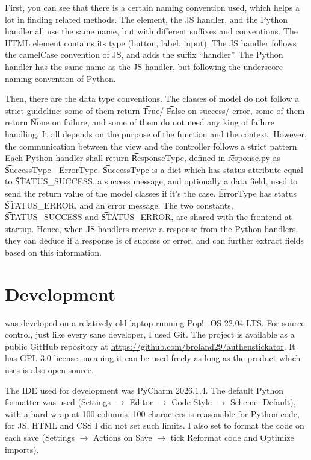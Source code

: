 First, you can see that there is a certain naming convention used, which helps a lot in finding related methods.
The element, the JS handler, and the Python handler all use the same name, but with different suffixes and conventions.
The HTML element contains its type (button, label, input).
The JS handler follows the camelCase convention of JS, and adds the suffix ``handler''.
The Python handler has the same name as the JS handler, but following the underscore naming convention of Python.

Then, there are the data type conventions.
The classes of model do not follow a strict guideline: some of them return \t{True}/ \t{False} on success/ error, some of them return \t{None} on failure, and some of them do not need any king of failure handling.
It all depends on the purpose of the function and the context.
However, the communication between the view and the controller follows a strict pattern.
Each Python handler shall return \t{ResponseType}, defined in \t{response.py} as \t {SuccessType | ErrorType}.
\t{SuccessType} is a dict which has status attribute equal to \t{STATUS\_SUCCESS}, a success message, and optionally a data field, used to send the return value of the model classes if it's the case.
\t{ErrorType} has status \t{STATUS\_ERROR}, and an error message.
The two constants, \t{STATUS\_SUCCESS} and \t{STATUS\_ERROR}, are shared with the frontend at startup.
Hence, when JS handlers receive a response from the Python handlers, they can deduce if a response is of success or error, and can further extract fields based on this information.


\section{Development} \label{lab:ch4-development}

\app{} was developed on a relatively old laptop running Pop!\_OS 22.04 LTS.
For source control, just like every sane developer, I used Git.
The project is available as a public GitHub repository at \url{https://github.com/broland29/authenstickator}.
It has GPL-3.0 license, meaning it can be used freely as long as the product which uses is also open source.

The IDE used for development was PyCharm 2026.1.4.
The default Python formatter was used (Settings $\rightarrow$ Editor $\rightarrow$ Code Style $\rightarrow$ Scheme: Default), with a hard wrap at 100 columns.
100 characters is reasonable for Python code, for JS, HTML and CSS I did not set such limits.
I also set to format the code on each save (Settings $\rightarrow$ Actions on Save $\rightarrow$ tick Reformat code and Optimize imports).

